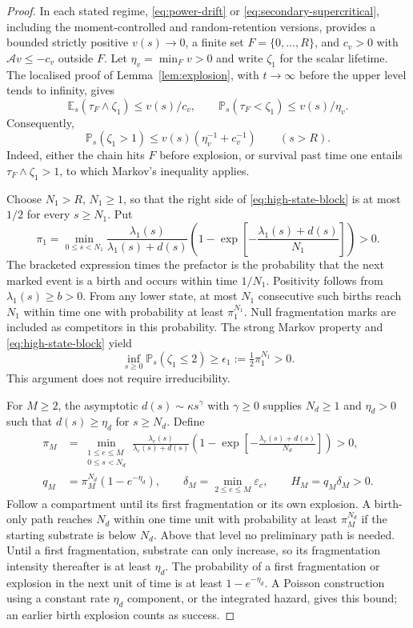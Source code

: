 \documentclass[11pt,a4paper]{article}
\theoremstyle{remark}\newtheorem{remark}[theorem]{Remark}
\newcommand{\E}{\mathbb E}
\newcommand{\Prob}{\mathbb P}
\newcommand{\A}{\mathcal A}
\begin{document}
\begin{proof}
In each stated regime, \eqref{eq:power-drift} or
\eqref{eq:secondary-supercritical}, including the moment-controlled and random-retention versions, provides a bounded strictly positive $v(s)\to0$, a finite set
$F=\{0,\ldots,R\}$, and $c_v>0$ with $\A v\le-c_v$ outside $F$.
Let $\eta_v=\min_F v>0$ and write $\zeta_1$ for the scalar lifetime.
The localised proof of Lemma~\ref{lem:explosion}, with $t\to\infty$ before the upper level tends to infinity, gives
\[
\E_s(\tau_F\wedge\zeta_1)\le v(s)/c_v,\qquad
\Prob_s(\tau_F<\zeta_1)\le v(s)/\eta_v.
\]
Consequently,
\begin{equation}\label{eq:high-state-block}
\Prob_s(\zeta_1>1)
\le v(s)(\eta_v^{-1}+c_v^{-1})\qquad(s>R).
\end{equation}
Indeed, either the chain hits $F$ before explosion, or survival past time one entails $\tau_F\wedge\zeta_1>1$, to which Markov's inequality applies.

Choose $N_1>R$, $N_1\ge1$, so that the right side of
\eqref{eq:high-state-block} is at most $1/2$ for every $s\ge N_1$. Put
\[
\pi_1=\min_{0\le s<N_1}
\frac{\lambda_1(s)}{\lambda_1(s)+d(s)}
\left(1-\exp\left[-\frac{\lambda_1(s)+d(s)}{N_1}\right]\right)>0.
\]
The bracketed expression times the prefactor is the probability that the next marked event is a birth and occurs within time $1/N_1$. Positivity follows from $\lambda_1(s)\ge b>0$. From any lower state, at most $N_1$ consecutive such births reach $N_1$ within time one with probability at least $\pi_1^{N_1}$. Null fragmentation marks are included as competitors in this probability. The strong Markov property and \eqref{eq:high-state-block} yield
\begin{equation}\label{eq:singleton-block}
\inf_{s\ge0}\Prob_s(\zeta_1\le2)\ge
\epsilon_1:=\tfrac12\pi_1^{N_1}>0.
\end{equation}
This argument does not require irreducibility.

For $M\ge2$, the asymptotic $d(s)\sim\kappa s^\gamma$ with $\gamma\ge0$ supplies $N_d\ge1$ and $\eta_d>0$ such that
$d(s)\ge\eta_d$ for $s\ge N_d$. Define
\begin{align*}
\pi_M&=\min_{\substack{1\le e\le M\\0\le s<N_d}}
\frac{\lambda_e(s)}{\lambda_e(s)+d(s)}
\left(1-\exp\left[-\frac{\lambda_e(s)+d(s)}{N_d}\right]\right)>0,\\
q_M&=\pi_M^{N_d}(1-e^{-\eta_d}),\qquad
\delta_M=\min_{2\le e\le M}\varepsilon_e,\qquad H_M=q_M\delta_M>0.
\end{align*}
Follow a compartment until its first fragmentation or its own explosion. A birth-only path reaches $N_d$ within one time unit with probability at least $\pi_M^{N_d}$ if the starting substrate is below $N_d$. Above that level no preliminary path is needed. Until a first fragmentation, substrate can only increase, so its fragmentation intensity thereafter is at least $\eta_d$. The probability of a first fragmentation or explosion in the next unit of time is at least $1-e^{-\eta_d}$. A Poisson construction using a constant rate $\eta_d$ component, or the integrated hazard, gives this bound; an earlier birth explosion counts as success.


\end{proof}
\end{document}
